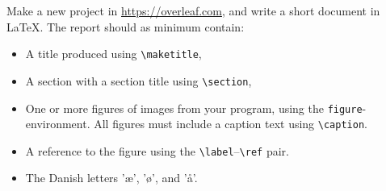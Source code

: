 Make a new project in \url{https://overleaf.com}, and write a short document in \LaTeX. The
report should as minimum contain:
\begin{itemize}
\item A title produced using \verb!\maketitle!, 
\item A section with a section title using \verb!\section!,
\item One or more figures of images from your program, using the
  \verb!figure!-environment. All figures must include a caption text
  using \verb!\caption!.
\item A reference to the figure using the
  \verb!\label!--\verb!\ref! pair.
\item The Danish letters 'æ', 'ø', and 'å'.
\end{itemize}